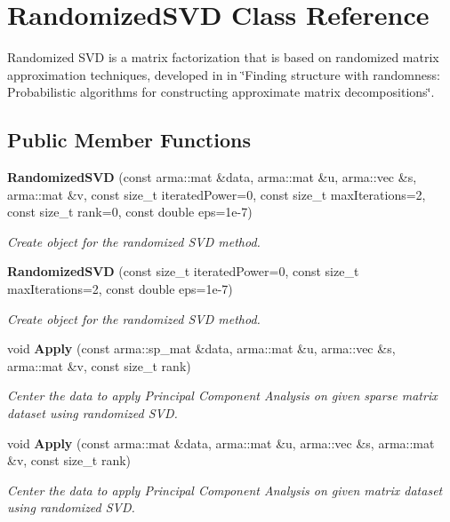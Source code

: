 \section{Randomized\+S\+VD Class Reference}
\label{classmlpack_1_1svd_1_1RandomizedSVD}


Randomized S\+VD is a matrix factorization that is based on randomized matrix approximation techniques, developed in in \char`\"{}\+Finding structure with randomness\+:
\+Probabilistic algorithms for constructing approximate matrix decompositions\char`\"{}.  


\subsection*{Public Member Functions}
\begin{DoxyCompactItemize}
\item 
\textbf{ Randomized\+S\+VD} (const arma\+::mat \&data, arma\+::mat \&u, arma\+::vec \&s, arma\+::mat \&v, const size\+\_\+t iterated\+Power=0, const size\+\_\+t max\+Iterations=2, const size\+\_\+t rank=0, const double eps=1e-\/7)
\begin{DoxyCompactList}\small\item\em Create object for the randomized S\+VD method. \end{DoxyCompactList}\item 
\textbf{ Randomized\+S\+VD} (const size\+\_\+t iterated\+Power=0, const size\+\_\+t max\+Iterations=2, const double eps=1e-\/7)
\begin{DoxyCompactList}\small\item\em Create object for the randomized S\+VD method. \end{DoxyCompactList}\item 
void \textbf{ Apply} (const arma\+::sp\+\_\+mat \&data, arma\+::mat \&u, arma\+::vec \&s, arma\+::mat \&v, const size\+\_\+t rank)
\begin{DoxyCompactList}\small\item\em Center the data to apply Principal Component Analysis on given sparse matrix dataset using randomized S\+VD. \end{DoxyCompactList}\item 
void \textbf{ Apply} (const arma\+::mat \&data, arma\+::mat \&u, arma\+::vec \&s, arma\+::mat \&v, const size\+\_\+t rank)
\begin{DoxyCompactList}\small\item\em Center the data to apply Principal Component Analysis on given matrix dataset using randomized S\+VD. \end{DoxyCompactList}\item 

\end{DoxyCompactItemize}
